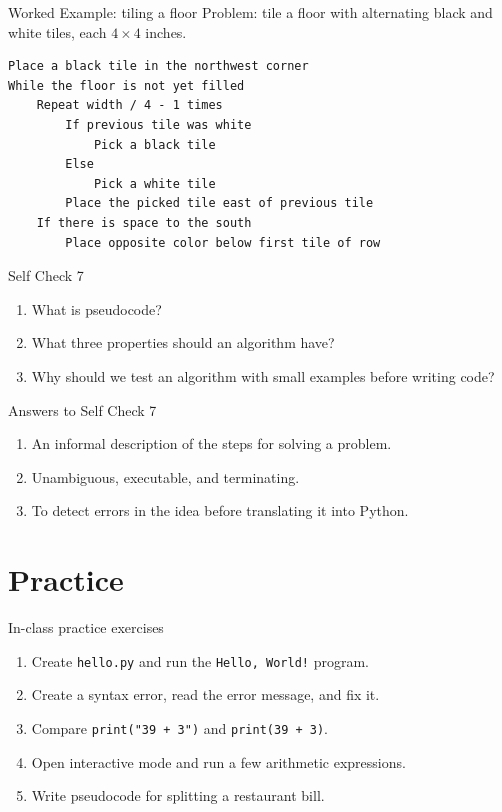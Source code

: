 \documentclass[aspectratio=169,10pt]{beamer}
\begin{document}
\begin{frame}[fragile]{Worked Example: tiling a floor}
Problem: tile a floor with alternating black and white tiles, each \(4 \times 4\) inches.

\begin{lstlisting}[language={}]
Place a black tile in the northwest corner
While the floor is not yet filled
    Repeat width / 4 - 1 times
        If previous tile was white
            Pick a black tile
        Else
            Pick a white tile
        Place the picked tile east of previous tile
    If there is space to the south
        Place opposite color below first tile of row
\end{lstlisting}
\end{frame}

\begin{frame}{Self Check 7}
\begin{enumerate}
  \item What is pseudocode?
  \item What three properties should an algorithm have?
  \item Why should we test an algorithm with small examples before writing code?
\end{enumerate}
\end{frame}

\begin{frame}{Answers to Self Check 7}
\begin{enumerate}
  \item An informal description of the steps for solving a problem.
  \item Unambiguous, executable, and terminating.
  \item To detect errors in the idea before translating it into Python.
\end{enumerate}
\end{frame}

\section{Practice}

\begin{frame}{In-class practice exercises}
\begin{enumerate}
  \item Create \texttt{hello.py} and run the \texttt{Hello, World!} program.
  \item Create a syntax error, read the error message, and fix it.
  \item Compare \texttt{print("39 + 3")} and \texttt{print(39 + 3)}.
  \item Open interactive mode and run a few arithmetic expressions.
  \item Write pseudocode for splitting a restaurant bill.
\end{enumerate}
\end{frame}
\end{document}
